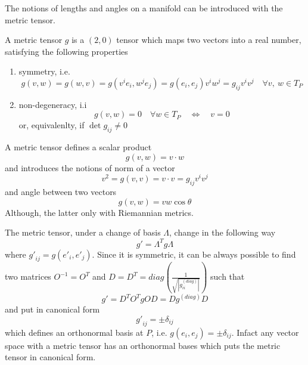     The notions of lengths and angles on a manifold can be introduced with the metric tensor. 

    A metric tensor $g$ is a $(2,0)$ tensor which maps two vectors into a real number, satisfying the following properties
    \begin{enumerate}
        \item symmetry, i.e.
            \begin{equation*}
                g(v,w) = g(w, v) = g(v^i e_i, w^j e_j) = g(e_i, e_j) v^i w^j = g_{ij} v^i v^j \quad \forall v, ~w \in T_P
            \end{equation*}
        \item non-degeneracy, i.i 
            \begin{equation*}
                g(v, w) = 0 \quad \forall w \in T_P \quad \iff \quad v=0 
            \end{equation*}
            or, equivalenlty, if $\det g_{ij} \neq 0$
    \end{enumerate}

    A metric tensor defines a scalar product 
    \begin{equation*}
        g(v, w) = v \cdot w
    \end{equation*}
    and introduces the notions of norm of a vector 
    \begin{equation*}
        v^2 = g(v,v) = v \cdot v = g_{ij} v^i v^j
    \end{equation*}
    and angle between two vectors 
    \begin{equation*}
        g(v, w) = v w \cos \theta
    \end{equation*}
    Although, the latter only with Riemannian metrics.

    The metric tensor, under a change of basis $\Lambda$, change in the following way
    \begin{equation*}
        g' = \Lambda^T g \Lambda
    \end{equation*}
    where ${g'}_{ij} = g({e'}_i, {e'}_j)$. Since it is symmetric, it can be always possible to find two matrices $O^{-1} = O^{T}$ and $D = D^T = diag(\frac{1}{\sqrt{|g_{ii}^{(diag)}|}})$ such that 
    \begin{equation*}
        g' = D^T O^T g O D = D g^{(diag)} D 
    \end{equation*} 
    and put in canonical form
    \begin{equation*}
        {g'}_{ij} = \pm \delta_{ij}
    \end{equation*}
    which defines an orthonormal basis at $P$, i.e. $g(e_i, e_j) = \pm \delta_{ij}$. Infact any vector space with a metric tensor has an orthonormal bases which puts the metric tensor in canonical form. 

